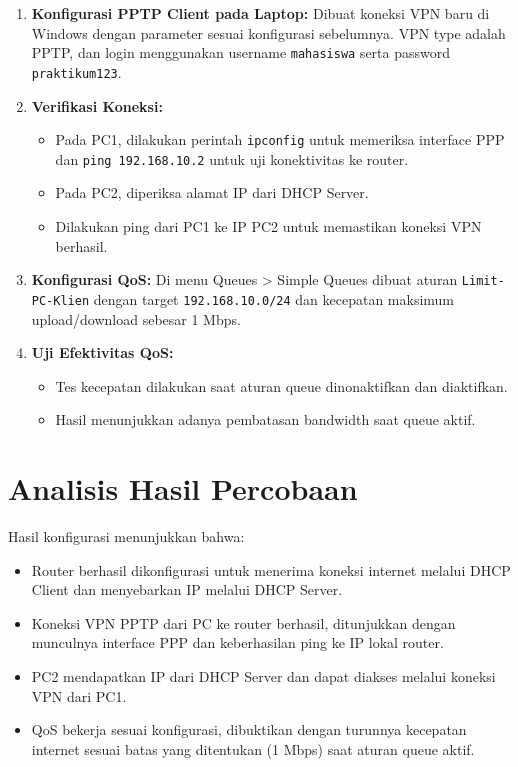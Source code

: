 \begin{enumerate}
    \item \textbf{Konfigurasi PPTP Client pada Laptop:} Dibuat koneksi VPN baru di Windows dengan parameter sesuai konfigurasi sebelumnya. VPN type adalah PPTP, dan login menggunakan username \texttt{mahasiswa} serta password \texttt{praktikum123}.
    
    \item \textbf{Verifikasi Koneksi:}
    \begin{itemize}
        \item Pada PC1, dilakukan perintah \texttt{ipconfig} untuk memeriksa interface PPP dan \texttt{ping 192.168.10.2} untuk uji konektivitas ke router.
        \item Pada PC2, diperiksa alamat IP dari DHCP Server.
        \item Dilakukan ping dari PC1 ke IP PC2 untuk memastikan koneksi VPN berhasil.
    \end{itemize}
    
    \item \textbf{Konfigurasi QoS:} Di menu Queues > Simple Queues dibuat aturan \texttt{Limit-PC-Klien} dengan target \texttt{192.168.10.0/24} dan kecepatan maksimum upload/download sebesar 1 Mbps.
    
    \item \textbf{Uji Efektivitas QoS:}
    \begin{itemize}
        \item Tes kecepatan dilakukan saat aturan queue dinonaktifkan dan diaktifkan.
        \item Hasil menunjukkan adanya pembatasan bandwidth saat queue aktif.
    \end{itemize}
\end{enumerate}

\section{Analisis Hasil Percobaan}
Hasil konfigurasi menunjukkan bahwa:
\begin{itemize}
    \item Router berhasil dikonfigurasi untuk menerima koneksi internet melalui DHCP Client dan menyebarkan IP melalui DHCP Server.
    \item Koneksi VPN PPTP dari PC ke router berhasil, ditunjukkan dengan munculnya interface PPP dan keberhasilan ping ke IP lokal router.
    \item PC2 mendapatkan IP dari DHCP Server dan dapat diakses melalui koneksi VPN dari PC1.
    \item QoS bekerja sesuai konfigurasi, dibuktikan dengan turunnya kecepatan internet sesuai batas yang ditentukan (1 Mbps) saat aturan queue aktif.
\end{itemize}

